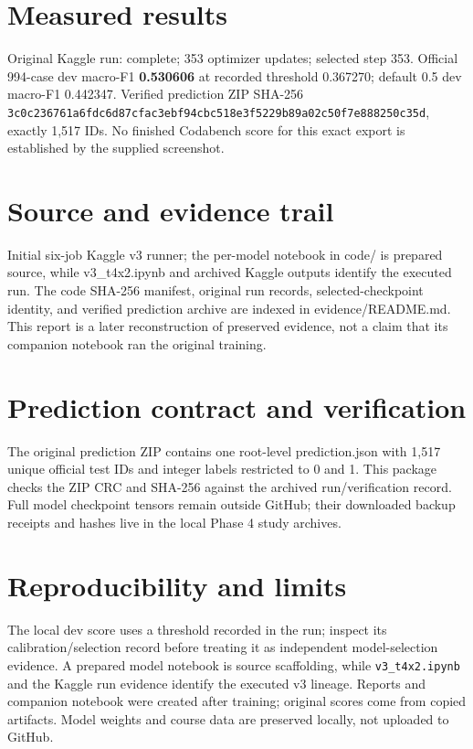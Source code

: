 \documentclass[11pt,a4paper]{article}
\begin{document}
\section{Measured results}
Original Kaggle run: complete; 353 optimizer updates; selected step 353. Official 994-case dev macro-F1 \textbf{0.530606} at recorded threshold 0.367270; default 0.5 dev macro-F1 0.442347. Verified prediction ZIP SHA-256 \texttt{3c0c236761a6fdc6d87cfac3ebf94cbc518e3f5229b89a02c50f7e888250c35d}, exactly 1,517 IDs. No finished Codabench score for this exact export is established by the supplied screenshot.
\section{Source and evidence trail}
Initial six-job Kaggle v3 runner; the per-model notebook in code/ is prepared source, while v3\_t4x2.ipynb and archived Kaggle outputs identify the executed run. The code SHA-256 manifest, original run records, selected-checkpoint identity, and verified prediction archive are indexed in evidence/README.md. This report is a later reconstruction of preserved evidence, not a claim that its companion notebook ran the original training.
\section{Prediction contract and verification}
The original prediction ZIP contains one root-level prediction.json with 1,517 unique official test IDs and integer labels restricted to 0 and 1. This package checks the ZIP CRC and SHA-256 against the archived run/verification record. Full model checkpoint tensors remain outside GitHub; their downloaded backup receipts and hashes live in the local Phase 4 study archives.
\section{Reproducibility and limits}
The local dev score uses a threshold recorded in the run; inspect its calibration/selection record before treating it as independent model-selection evidence. A prepared model notebook is source scaffolding, while \texttt{v3\_t4x2.ipynb} and the Kaggle run evidence identify the executed v3 lineage. Reports and companion notebook were created after training; original scores come from copied artifacts. Model weights and course data are preserved locally, not uploaded to GitHub.
\end{document}
